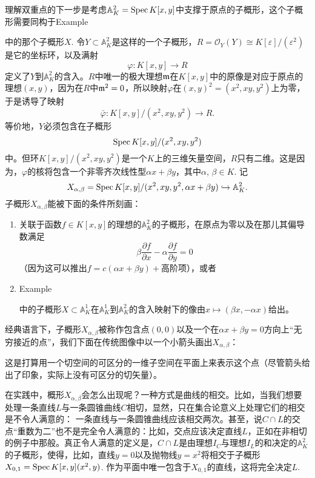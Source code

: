 \begin{exa}[双重点]
理解双重点的下一步是考虑$\mathbb{A}_K^2=\operatorname{Spec} K[x,y]$中支撑于原点的子概形，这个子概形需要同构于Example {{\addtocounter{thm}{-1}}\thethm{\addtocounter{thm}{1}}}中的那个子概形$X$. 令$Y\subset \mathbb{A}_K^2$是这样的一个子概形，$R=\mathscr{O}_Y(Y)\cong K[\varepsilon]/(\varepsilon^2)$是它的坐标环，以及满射
\[
	\varphi:K[x,y]\to R
\]
定义了$Y$到$\mathbb{A}_K^2$的含入。$R$中唯一的极大理想$\mathfrak{m}$在$K[x,y]$中的原像是对应于原点的理想$(x,y)$，因为在$R$中$\mathfrak{m}^2=0$，所以映射$\varphi$在$(x,y)^2=(x^2,xy,y^2)$上为零，于是诱导了映射
\[
	\bar\varphi:K[x,y]/(x^2,xy,y^2)\to R.
\]
等价地，$Y$必须包含在子概形
\[
	\operatorname{Spec} K[x,y]/(x^2,xy,y^2)
\]
中。但环$K[x,y]/(x^2,xy,y^2)$是一个$K$上的三维矢量空间，$R$只有二维。这是因为，$\varphi$的核将包含一个非零齐次线性型$\alpha x+\beta y$，其中$\alpha$, $\beta\in K$. 记
\[
	X_{\alpha,\beta}=\operatorname{Spec} K[x,y]/(x^2,xy,y^2,\alpha x+\beta y)\hookrightarrow \mathbb{A}_K^2.
\]
子概形$X_{\alpha,\beta}$能被下面的条件所刻画：

\begin{enumerate}[{(i)}]\setlength{\itemsep}{0pt}
\item 关联于函数$f\in K[x,y]$的理想的$\mathbb{A}^2_K$的子概形，在原点为零以及在那儿其偏导数满足
\[
	\beta\frac{\partial f}{\partial x}-\alpha\frac{\partial f}{\partial y}=0
\]
（因为这可以推出$f=c(\alpha x+\beta y)+\text{高阶项}$），或者
\item Example {{\addtocounter{thm}{-1}}\thethm{\addtocounter{thm}{1}}}中的子概形$X\subset \mathbb{A}_K^1$在$\mathbb{A}_K^1$到$\mathbb{A}_K^2$的含入映射下的像由$x\mapsto (\beta x,-\alpha x)$给出。
\end{enumerate}

经典语言下，子概形$X_{\alpha,\beta}$被称作包含点$(0,0)$以及一个在$\alpha x+\beta y=0$方向上“无穷接近的点”，我们下面在传统图像中以一个小箭头画出$X_{\alpha,\beta}$：


\noindent 这是打算用一个切空间的可区分的一维子空间在平面上来表示这个点（尽管箭头给出了印象，实际上没有可区分的切矢量）。\nottran
\end{exa}

在实践中，概形$X_{\alpha,\beta}$会怎么出现呢？一种方式是曲线的相交。比如，当我们想要处理一条直线$L$与一条圆锥曲线$C$相切，显然，只在集合论意义上处理它们的相交是不令人满意的：
一条直线与一条圆锥曲线应该相交两次。甚至，说$C\cap L$的交点“重数为二”也不是完全令人满意的：比如，交点应该决定直线$L$，正如在非相切的例子中那般。真正令人满意的定义是，$C\cap L$是由理想$I_C$与理想$I_L$的和决定的$\mathbb{A}_K^2$的子概形，使得，比如，直线$y=0$以及抛物线$y=x^2$将相交于子概形$X_{0,1}=\operatorname{Spec} K[x,y](x^2,y)$. 作为平面中唯一包含于$X_{0,1}$的直线，这将完全决定$L$. 


